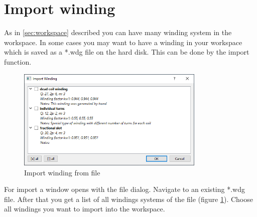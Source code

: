 \documentclass[]{scrreprt}
\begin{document}
\section{Import winding}
As in \ref{sec:workspace} described you can have many winding system in the workspace.
In some cases you may want to have a winding in your workspace which is saved as a
*.wdg file on the hard disk. This can be done by the import function.
%
\begin{figure}[htpb]
    \centering
    \includegraphics[width=0.8\textwidth,angle=0]{fig/import}
    \caption{Import winding from file }
    \label{fig:import}
\end{figure}
%
For import a window opens with the file dialog. Navigate to an existing *.wdg file. After that you get a list of all windings systems of the file (figure \ref{fig:import}). Choose
all windings you want to import into the workspace.








\end{document}

